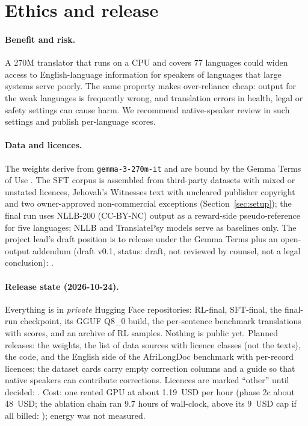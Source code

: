 \section{Ethics and release}\label{sec:ethics}
\paragraph{Benefit and risk.} A 270M translator that runs on a CPU and covers 77 languages could widen access to English-language information for speakers of languages that large systems serve poorly. The same property makes over-reliance cheap: output for the weak languages is frequently wrong, and translation errors in health, legal or safety settings can cause harm. We recommend native-speaker review in such settings and publish per-language scores.
\paragraph{Data and licences.} The weights derive from \texttt{gemma-3-270m-it} and are bound by the Gemma Terms of Use \citep{gemma_terms}. The SFT corpus is assembled from third-party datasets with mixed or unstated licences, Jehovah's Witnesses text with uncleared publisher copyright and two owner-approved non-commercial exceptions (Section~\ref{sec:setup}); the final run uses NLLB-200 (CC-BY-NC) output as a reward-side pseudo-reference for five languages; NLLB and TranslatePsy models serve as baselines only. The project lead's draft position is to release under the Gemma Terms plus an open-output addendum (draft v0.1, status: draft, not reviewed by counsel, not a legal conclusion): .
\paragraph{Release state (2026-10-24).} Everything is in \emph{private} Hugging Face repositories: RL-final, SFT-final, the final-run checkpoint, its GGUF Q8\_0 build, the per-sentence benchmark translations with scores, and an archive of RL samples. Nothing is public yet. Planned releases: the weights, the list of data sources with licence classes (not the texts), the code, and the English side of the AfriLongDoc benchmark with per-record licences; the dataset cards carry empty correction columns and a guide so that native speakers can contribute corrections. Licences are marked ``other'' until decided: . Cost: one rented GPU at about 1.19~USD per hour (phase 2c about 48~USD; the ablation chain ran 9.7 hours of wall-clock, above its 9~USD cap if all billed: ); energy was not measured.
